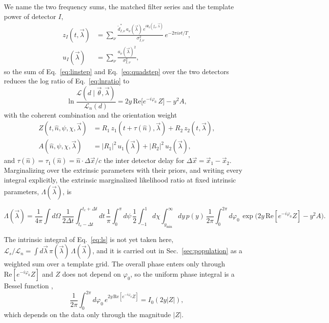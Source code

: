 \documentclass[aps,prd,twocolumn,superscriptaddress,nofootinbib]{revtex4-2}
\begin{document}
We name the two frequency sums, the matched filter series and
the template power of detector $I$,
\begin{equation}
\begin{aligned}
z_I(t, \vec\lambda) &= \sum_\nu
\frac{\tilde d^{*}_{I,\nu}\, a_\nu(\vec\lambda)\,
e^{i \Psi_0(f_\nu, \vec\lambda)}}
{\sigma^2_{I,\nu}}\, e^{-2\pi i \nu t / T},\\
u_I(\vec\lambda) &= \sum_\nu
\frac{a_\nu(\vec\lambda)^2}{\sigma^2_{I,\nu}},
\end{aligned}
\label{eq:zu}
\end{equation}
so the sum of Eq.~\eqref{eq:linstep} and
Eq.~\eqref{eq:quadstep} over the two detectors reduces the log
ratio of Eq.~\eqref{eq:lnratio} to
\begin{equation}
\ln \frac{\mathcal{L}(d \mid \vec\theta, \vec\lambda)}
{\mathcal{L}_n(d)}
= 2 y\, \mathrm{Re}\big[ e^{-i\varphi_0}\, Z \big] - y^2 A,
\label{eq:reduced}
\end{equation}
with the coherent combination and the orientation weight
\begin{equation}
\begin{aligned}
Z(t, \hat n, \psi, \chi, \vec\lambda)
&= R_1\, z_1(t + \tau(\hat n), \vec\lambda)
+ R_2\, z_2(t, \vec\lambda),\\
A(\hat n, \psi, \chi, \vec\lambda)
&= |R_1|^2\, u_1(\vec\lambda)
+ |R_2|^2\, u_2(\vec\lambda),
\end{aligned}
\label{eq:ZA}
\end{equation}
and $\tau(\hat n) = \tau_1(\hat n) = \hat n \cdot \Delta \vec x / c$
the inter detector delay for
$\Delta \vec x = \vec x_1 - \vec x_2$. Marginalizing over the
extrinsic parameters with their priors, and writing every integral
explicitly, the extrinsic marginalized likelihood ratio at fixed
intrinsic parameters, $\Lambda(\vec\lambda)$, is
\begin{widetext}
\begin{equation}
\Lambda(\vec\lambda) = \frac{1}{4\pi} \int d\Omega\,
\frac{1}{2\Delta t} \int_{t_c - \Delta t}^{t_c + \Delta t} dt\,
\frac{1}{\pi} \int_0^\pi d\psi\,
\frac{1}{2} \int_{-1}^1 d\chi
\int_{y_{\min}}^\infty dy\, p(y)\,
\frac{1}{2\pi} \int_0^{2\pi} d\varphi_0\,
\exp\!\big( 2 y\, \mathrm{Re}[ e^{-i\varphi_0} Z ] - y^2 A \big).
\label{eq:marg}
\end{equation}
\end{widetext}
The intrinsic integral of Eq.~\eqref{eq:ls} is not yet taken here,
$\mathcal{L}_s / \mathcal{L}_n = \int d\vec\lambda\,
\pi(\vec\lambda)\, \Lambda(\vec\lambda)$, and it is carried out
in Sec.~\ref{sec:population} as a weighted sum over a template grid.
The overall phase enters only
through $\mathrm{Re}[ e^{-i\varphi_0} Z ]$ and $Z$ does not depend
on $\varphi_0$, so the uniform phase integral is a Bessel function
\cite{DLMF},
\begin{equation}
\frac{1}{2\pi} \int_0^{2\pi} d\varphi_0\,
e^{2 y\, \mathrm{Re}[ e^{-i\varphi_0} Z ]} = I_0( 2 y |Z| ),
\label{eq:bessel}
\end{equation}
which depends on the data only through the magnitude $|Z|$.
\end{document}
